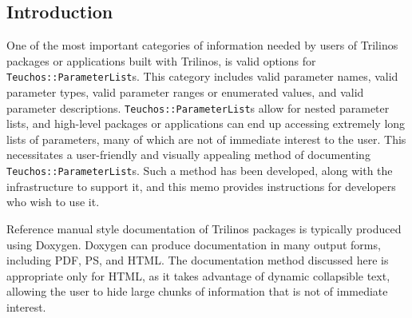 \documentclass[pdf,ps2pdf,12pt]{smemo}
\begin{document}
    \begin{memo}


    \date{}




    \subject{How to Document \texttt{Teuchos::ParameterList}s with collapsable HTML}




\section{Introduction}
\label{sec:intro}

One of the most important categories of information needed by users of
Trilinos packages or applications built with Trilinos, is valid
options for \texttt{Teuchos::ParameterList}s.  This category includes
valid parameter names, valid parameter types, valid parameter ranges
or enumerated values, and valid parameter descriptions.
\texttt{Teuchos::ParameterList}s allow for nested parameter lists, and
high-level packages or applications can end up accessing extremely
long lists of parameters, many of which are not of immediate interest
to the user.  This necessitates a user-friendly and visually appealing
method of documenting \texttt{Teuchos::ParameterList}s.  Such a method
has been developed, along with the infrastructure to support it, and
this memo provides instructions for developers who wish to use it.

Reference manual style documentation of Trilinos packages is typically
produced using Doxygen.  Doxygen can produce documentation in many
output forms, including PDF, PS, and HTML.  The documentation method
discussed here is appropriate only for HTML, as it takes advantage of
dynamic collapsible text, allowing the user to hide large chunks of
information that is not of immediate interest.


\end{memo}
\end{document}

